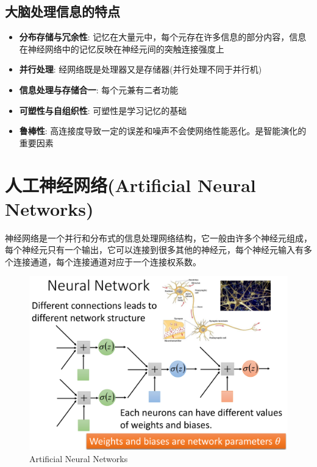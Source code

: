 \subsection*{大脑处理信息的特点}
\begin{itemize}
\item \textbf{分布存储与冗余性}: 记忆在大量元中，每个元存在许多信息的部分内容，信息在神经网络中的记忆反映在神经元间的突触连接强度上

\item \textbf{并行处理}: 经网络既是处理器又是存储器(并行处理不同于并行机)

\item \textbf{信息处理与存储合一}: 每个元兼有二者功能

\item \textbf{可塑性与自组织性}: 可塑性是学习记忆的基础

\item \textbf{鲁棒性}: 高连接度导致一定的误差和噪声不会使网络性能恶化。是智能演化的重要因素

\end{itemize}

\newpage
\section{人工神经网络(Artificial Neural Networks)
}
神经网络是一个并行和分布式的信息处理网络结构，它一般由许多个神经元组成，每个神经元只有一个输出，它可以连接到很多其他的神经元，每个神经元输入有多个连接通道，每个连接通道对应于一个连接权系数。

\begin{figure}[h]
\small
\centering
\includegraphics[width=16cm]{figure//2.png}
\caption{Artificial Neural Networks} \label{fig:2}
\end{figure}


